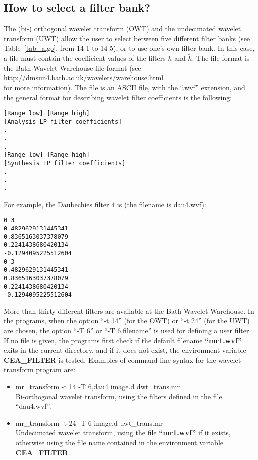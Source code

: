 \subsection{How to select a filter bank?}
The (bi-) orthogonal wavelet transform (OWT) and the 
undecimated wavelet transform (UWT) allow the user to select between
five different filter banks (see Table~\ref{tab_algo}, from 14-1 to 14-5), 
or to use one's own filter bank. In this case, a file must contain the 
coefficient values of the filters $h$ and $\tilde h$. 
The file format is the Bath Wavelet Warehouse file format 
(see \\
http://dmsun4.bath.ac.uk/wavelets/warehouse.html \\
for more information).
The file is an ASCII file, with the ``.wvf'' extension, 
and the general format for describing wavelet filter coefficients is 
the following:
\begin{verbatim}
[Range low] [Range high]
[Analysis LP filter coefficients]
.
.
.
[Range low] [Range high]
[Synthesis LP filter coefficients]
.
.
.
\end{verbatim}
For example, the Daubechies filter 4 is (the filename is dau4.wvf):
\begin{verbatim}
0 3
0.4829629131445341
0.8365163037378079
0.2241438680420134
-0.1294095225512604
0 3
0.4829629131445341
0.8365163037378079
0.2241438680420134
-0.1294095225512604
\end{verbatim}
More than thirty different filters are available at the  
Bath Wavelet Warehouse.
In the \proj programs, when the option ``-t 14'' (for the OWT) or ``-t 24''
(for the UWT) are chosen, the option ``-T 6'' or  ``-T 6,filename'' is used 
for defining a user filter. If no file is given, the \proj programs first
check if the default filename {\bf ``mr1.wvf''} exits in the current 
directory, and if it does not exist,
the environment variable {\bf CEA\_FILTER}  is tested. 
Examples of command line syntax for the wavelet transform program are:
\begin{itemize}
\item mr\_transform -t 14 -T 6,dau4 image.d dwt\_trans.mr \\
Bi-orthogonal wavelet transform, using the filters defined in
the file ``dau4.wvf''.  
\item mr\_transform -t 24 -T 6 image.d uwt\_trans.mr\\
Undecimated wavelet transform, using the file {\bf ``mr1.wvf''} if it
exists, otherwise using the file name contained in the environment 
variable {\bf CEA\_FILTER}.
\end{itemize}


